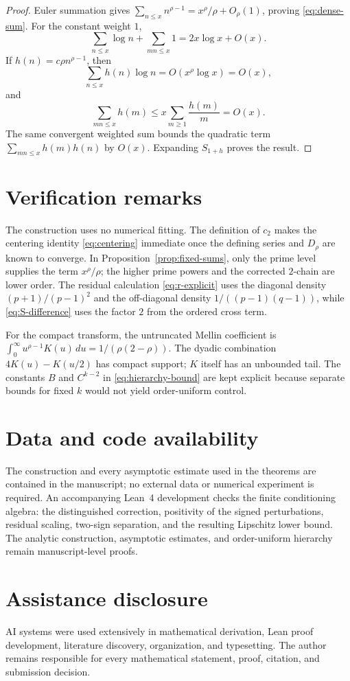 \documentclass[11pt,a4paper]{amsart}
\theoremstyle{definition}
\newcommand{\1}{\mathbf 1}
\begin{document}
\begin{proof}
Euler summation gives
$\sum_{n\le x}n^{\rho-1}=x^\rho/\rho+O_\rho(1)$, proving
\eqref{eq:dense-sum}.  For the constant weight $1$,
\[
 \sum_{n\le x}\log n+\sum_{mn\le x}1
 =2x\log x+O(x).
\]
If $h(n)=c\rho n^{\rho-1}$, then
\[
 \sum_{n\le x}h(n)\log n=O(x^\rho\log x)=O(x),
\]
and
\[
 \sum_{mn\le x}h(m)
 \le x\sum_{m\ge1}\frac{h(m)}m=O(x).
\]
The same convergent weighted sum bounds the quadratic term
$\sum_{mn\le x}h(m)h(n)$ by $O(x)$.  Expanding $S_{1+h}$ proves the result.
\end{proof}

\enlargethispage{\baselineskip}
\section{Verification remarks}\label{app:repro}

The construction uses no numerical fitting.  The definition of $c_2$ makes
the centering identity \eqref{eq:centering} immediate once the defining series
and $D_\rho$ are known to converge.  In Proposition~\ref{prop:fixed-sums}, only the prime level supplies
the term $x^\rho/\rho$; the higher prime powers and the corrected $2$-chain
are lower order.  The residual calculation \eqref{eq:r-explicit} uses the
diagonal density $(p+1)/(p-1)^2$ and the off-diagonal density
$1/((p-1)(q-1))$, while \eqref{eq:S-difference} uses the factor $2$ from the
ordered cross term.

For the compact transform, the untruncated Mellin coefficient is
$\int_0^\infty u^{\rho-1}K(u)\,du=1/(\rho(2-\rho))$.  The dyadic combination
$4K(u)-K(u/2)$ has compact support; $K$ itself has an unbounded tail.  The constants
$B$ and $C^{k-2}$ in \eqref{eq:hierarchy-bound} are kept explicit because
separate bounds for fixed $k$ would not yield order-uniform control.

\section*{Data and code availability}

The construction and every asymptotic estimate used in the theorems are
contained in the manuscript; no external data or numerical experiment is
required.  An accompanying Lean~4 development checks the finite conditioning
algebra: the distinguished correction, positivity of the signed
perturbations, residual scaling, two-sign separation, and the resulting
Lipschitz lower bound.  The analytic construction, asymptotic estimates, and
order-uniform hierarchy remain manuscript-level proofs.

\section*{Assistance disclosure}

AI systems were used extensively in mathematical derivation, Lean proof
development, literature discovery, organization, and typesetting.  The author
remains responsible for every mathematical statement, proof, citation, and
submission decision.



\end{document}
